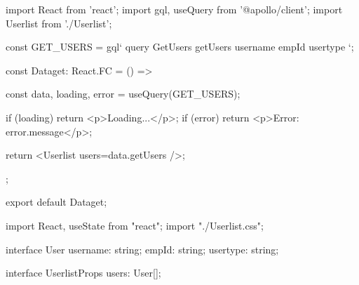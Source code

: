import React from 'react';
import { gql, useQuery } from '@apollo/client';
import Userlist from './Userlist';

const GET_USERS = gql`
query GetUsers {
    getUsers {
        username
        empId
        usertype
    }
}
`;

const Dataget: React.FC = () => {
    const { data, loading, error } = useQuery(GET_USERS);

    if (loading) return <p>Loading...</p>;
    if (error) return <p>Error: {error.message}</p>;

    return <Userlist users={data.getUsers} />;
};

export default Dataget;


import React, { useState } from "react";
import "./Userlist.css";

interface User {
  username: string;
  empId: string;
  usertype: string;
}

interface UserlistProps {
  users: User[];
}

